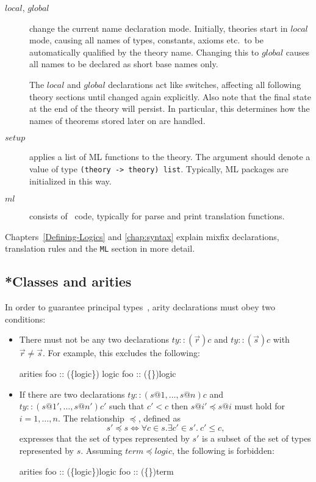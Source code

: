 \begin{description}
\item[$local$, $global$] change the current name declaration mode.
  Initially, theories start in $local$ mode, causing all names of
  types, constants, axioms etc.\ to be automatically qualified by the
  theory name.  Changing this to $global$ causes all names to be
  declared as short base names only.
  
  The $local$ and $global$ declarations act like switches, affecting
  all following theory sections until changed again explicitly.  Also
  note that the final state at the end of the theory will persist.  In
  particular, this determines how the names of theorems stored later
  on are handled.
  
\item[$setup$] applies a list of ML functions to
  the theory.  The argument should denote a value of type
  \texttt{(theory -> theory) list}.  Typically, ML packages are
  initialized in this way.

\item[$ml$] 
  consists of \ML\ code, typically for parse and print translation functions.
\end{description}
%
Chapters~\ref{Defining-Logics} and \ref{chap:syntax} explain mixfix
declarations, translation rules and the \texttt{ML} section in more detail.


\subsection{*Classes and arities}

In order to guarantee principal types~\cite{nipkow-prehofer},
arity declarations must obey two conditions:
\begin{itemize}
\item There must not be any two declarations $ty :: (\vec{r})c$ and
  $ty :: (\vec{s})c$ with $\vec{r} \neq \vec{s}$.  For example, this
  excludes the following:
\begin{ttbox}
arities
  foo :: (\{logic{\}}) logic
  foo :: (\{{\}})logic
\end{ttbox}

\item If there are two declarations $ty :: (s@1,\dots,s@n)c$ and $ty ::
  (s@1',\dots,s@n')c'$ such that $c' < c$ then $s@i' \preceq s@i$ must hold
  for $i=1,\dots,n$.  The relationship $\preceq$, defined as
\[ s' \preceq s \iff \forall c\in s. \exists c'\in s'.~ c'\le c, \]
expresses that the set of types represented by $s'$ is a subset of the
set of types represented by $s$.  Assuming $term \preceq logic$, the
following is forbidden:
\begin{ttbox}
arities
  foo :: (\{logic{\}})logic
  foo :: (\{{\}})term
\end{ttbox}

\end{itemize}



